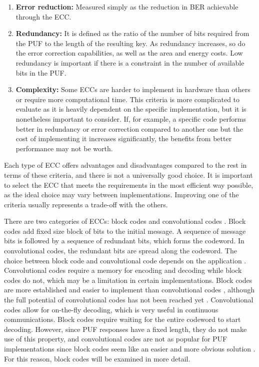 \begin{enumerate}
    \item \textbf{Error reduction:} Measured simply as the reduction in BER achievable through the ECC. 
    \item \textbf{Redundancy:} It is defined as the ratio of the number of bits required from the PUF to the length of the resulting key. As redundancy increases, so do the error correction capabilities, as well as the area and energy costs. Low redundancy is important if there is a constraint in the number of available bits in the PUF.
    \item \textbf{Complexity:} Some ECCs are harder to implement in hardware than others or require more computational time. This criteria is more complicated to evaluate as it is heavily dependent on the specific implementation, but it is nonetheless important to consider. If, for example, a specific code performs better in redundancy or error correction compared to another one but the cost of implementing it increases significantly, the benefits from better performance may not be worth.
    
\end{enumerate}

Each type of ECC offers advantages and disadvantages compared to the rest in terms of these criteria, and there is not a universally good choice. It is important to select the ECC that meets the requirements in the most efficient way possible, as the ideal choice may vary between implementations. Improving one of the criteria usually represents a trade-off with the others. 



 There are two categories of ECCs: block codes and convolutional codes \cite{CastineiraMoreira2006}. Block codes add fixed size block of bits to the initial message. A sequence of message bits is followed by a sequence of redundant bits, which forms the codeword. In convolutional codes, the redundant bits are spread along the codeword. The choice between block code and convolutional code depends on the application \cite{Johannesson2015}. Convolutional codes require a memory for encoding and decoding while block codes do not, which may be a limitation in certain implementations. Block codes are more established and easier to implement than convolutional codes \cite{CastineiraMoreira2006}, although the full potential of convolutional codes has not been reached yet \cite{Rachinger2015}.  Convolutional codes allow for on-the-fly decoding, which is very useful in continuous communications. Block codes require waiting for the entire codeword to start decoding. However, since PUF responses have a fixed length, they do not make use of this property, and convolutional codes are not as popular for PUF implementations since block codes seem like an easier and more obvious solution \cite{Maes2009}. For this reason, block codes will be examined in more detail. 
 
